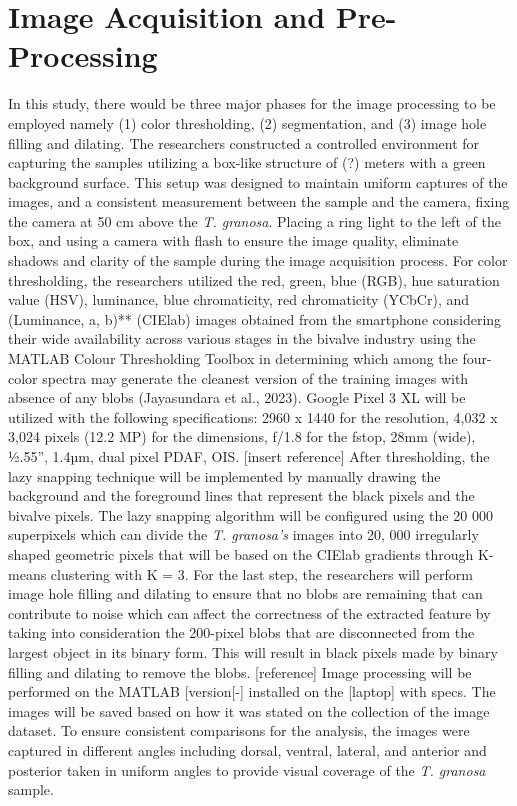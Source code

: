\section{Image Acquisition and Pre-Processing}
In this study, there would be three major phases for the image processing to be employed namely (1) color thresholding, (2) segmentation, and (3) image hole filling and dilating. The researchers constructed a controlled environment for capturing the samples utilizing a box-like structure of (?) meters with a green background surface. This setup was designed to maintain uniform captures of the images, and a consistent measurement between the sample and the camera, fixing the camera at 50 cm above the \textit{T. granosa}. Placing a ring light to the left of the box, and using a camera with flash to ensure the image quality, eliminate shadows and clarity of the sample during the image acquisition process. 
For color thresholding, the researchers utilized the red, green, blue (RGB), hue saturation value (HSV), luminance, blue chromaticity, red chromaticity (YCbCr), and (Luminance, a, b)** (CIElab) images obtained from the smartphone considering their wide availability across various stages in the bivalve industry using the MATLAB Colour Thresholding Toolbox in determining which among the four-color spectra may generate the cleanest version of the training images with absence of any blobs (Jayasundara et al., 2023). Google Pixel 3 XL will be utilized with the following specifications: 2960 x 1440 for the resolution, 4,032 x 3,024 pixels (12.2 MP) for the dimensions, f/1.8 for the fstop, 28mm (wide), ½.55”, 1.4µm, dual pixel PDAF, OIS. [insert reference]
After thresholding, the lazy snapping technique will be implemented by manually drawing the background and the foreground lines that represent the black pixels and the bivalve pixels. The lazy snapping algorithm will be configured using the 20 000 superpixels which can divide the \textit{T. granosa’s} images into 20, 000 irregularly shaped geometric pixels that will be based on the CIElab gradients through K-means clustering with K = 3. For the last step, the researchers will perform image hole filling and dilating to ensure that no blobs are remaining that can contribute to noise which can affect the correctness of the extracted feature by taking into consideration the 200-pixel blobs that are disconnected from the largest object in its binary form. This will result in black pixels made by binary filling and dilating to remove the blobs.  [reference]
Image processing will be performed on the MATLAB [version[-] installed on the [laptop] with specs. The images will be saved based on how it was stated on the collection of the image dataset. 
To ensure consistent comparisons for the analysis, the images were captured in different angles including dorsal, ventral, lateral, and anterior and posterior taken in uniform angles to provide visual coverage of the \textit{T. granosa} sample. 

